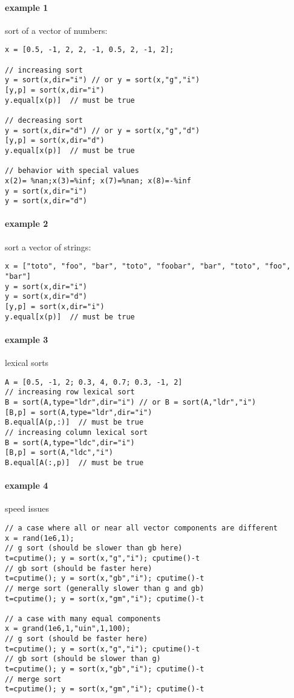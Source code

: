 \begin{examples}

\paragraph{example 1} sort of a vector of numbers:
\begin{Verbatim}
x = [0.5, -1, 2, 2, -1, 0.5, 2, -1, 2];

// increasing sort
y = sort(x,dir="i") // or y = sort(x,"g","i")
[y,p] = sort(x,dir="i")
y.equal[x(p)]  // must be true

// decreasing sort
y = sort(x,dir="d") // or y = sort(x,"g","d")
[y,p] = sort(x,dir="d")
y.equal[x(p)]  // must be true

// behavior with special values
x(2)= %nan;x(3)=%inf; x(7)=%nan; x(8)=-%inf
y = sort(x,dir="i")
y = sort(x,dir="d")
\end{Verbatim}

\paragraph{example 2} sort a vector of strings:
\begin{Verbatim}
x = ["toto", "foo", "bar", "toto", "foobar", "bar", "toto", "foo", "bar"]
y = sort(x,dir="i")
y = sort(x,dir="d")
[y,p] = sort(x,dir="i")
y.equal[x(p)]  // must be true
\end{Verbatim}

\paragraph{example 3} lexical sorts
\begin{Verbatim}
A = [0.5, -1, 2; 0.3, 4, 0.7; 0.3, -1, 2]
// increasing row lexical sort
B = sort(A,type="ldr",dir="i") // or B = sort(A,"ldr","i")
[B,p] = sort(A,type="ldr",dir="i")
B.equal[A(p,:)]  // must be true
// increasing column lexical sort
B = sort(A,type="ldc",dir="i")
[B,p] = sort(A,"ldc","i")
B.equal[A(:,p)]  // must be true
\end{Verbatim}

\paragraph{example 4} speed issues
\begin{Verbatim}
// a case where all or near all vector components are different
x = rand(1e6,1);
// g sort (should be slower than gb here)
t=cputime(); y = sort(x,"g","i"); cputime()-t
// gb sort (should be faster here)
t=cputime(); y = sort(x,"gb","i"); cputime()-t
// merge sort (generally slower than g and gb)
t=cputime(); y = sort(x,"gm","i"); cputime()-t

// a case with many equal components
x = grand(1e6,1,"uin",1,100);
// g sort (should be faster here)
t=cputime(); y = sort(x,"g","i"); cputime()-t
// gb sort (should be slower than g)
t=cputime(); y = sort(x,"gb","i"); cputime()-t
// merge sort
t=cputime(); y = sort(x,"gm","i"); cputime()-t
\end{Verbatim}

\end{examples}

